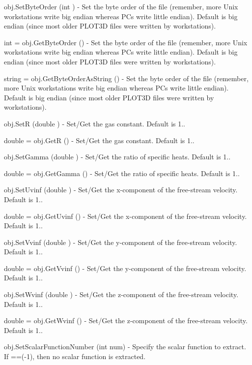 \begin{DoxyItemize}
\item {\ttfamily obj.\-Set\-Byte\-Order (int )} -\/ Set the byte order of the file (remember, more Unix workstations write big endian whereas P\-Cs write little endian). Default is big endian (since most older P\-L\-O\-T3\-D files were written by workstations).  
\item {\ttfamily int = obj.\-Get\-Byte\-Order ()} -\/ Set the byte order of the file (remember, more Unix workstations write big endian whereas P\-Cs write little endian). Default is big endian (since most older P\-L\-O\-T3\-D files were written by workstations).  
\item {\ttfamily string = obj.\-Get\-Byte\-Order\-As\-String ()} -\/ Set the byte order of the file (remember, more Unix workstations write big endian whereas P\-Cs write little endian). Default is big endian (since most older P\-L\-O\-T3\-D files were written by workstations).  
\item {\ttfamily obj.\-Set\-R (double )} -\/ Set/\-Get the gas constant. Default is 1..  
\item {\ttfamily double = obj.\-Get\-R ()} -\/ Set/\-Get the gas constant. Default is 1..  
\item {\ttfamily obj.\-Set\-Gamma (double )} -\/ Set/\-Get the ratio of specific heats. Default is 1..  
\item {\ttfamily double = obj.\-Get\-Gamma ()} -\/ Set/\-Get the ratio of specific heats. Default is 1..  
\item {\ttfamily obj.\-Set\-Uvinf (double )} -\/ Set/\-Get the x-\/component of the free-\/stream velocity. Default is 1..  
\item {\ttfamily double = obj.\-Get\-Uvinf ()} -\/ Set/\-Get the x-\/component of the free-\/stream velocity. Default is 1..  
\item {\ttfamily obj.\-Set\-Vvinf (double )} -\/ Set/\-Get the y-\/component of the free-\/stream velocity. Default is 1..  
\item {\ttfamily double = obj.\-Get\-Vvinf ()} -\/ Set/\-Get the y-\/component of the free-\/stream velocity. Default is 1..  
\item {\ttfamily obj.\-Set\-Wvinf (double )} -\/ Set/\-Get the z-\/component of the free-\/stream velocity. Default is 1..  
\item {\ttfamily double = obj.\-Get\-Wvinf ()} -\/ Set/\-Get the z-\/component of the free-\/stream velocity. Default is 1..  
\item {\ttfamily obj.\-Set\-Scalar\-Function\-Number (int num)} -\/ Specify the scalar function to extract. If ==(-\/1), then no scalar function is extracted.  

\end{DoxyItemize}
